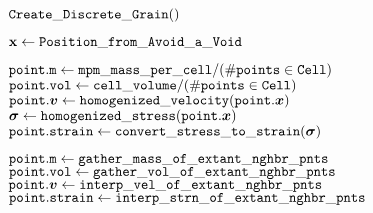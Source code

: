 \begin{algorithm}
\caption{${\tt Discrete \_ Avoid \_ a \_ Void}$}
\begin{algorithmic}[1]
      \State ${\tt Create \_ Discrete \_ Grain}()$
    \EndFor
  \EndFor
\end{algorithmic} \label{alg:discrete_avoid_a_void}
\end{algorithm}

\begin{algorithm}
\caption{${\tt Create \_ Continuum \_ Particle]}$}
\begin{algorithmic}[1]
\State $\mathbf{x} \gets {\tt Position \_ from \_ Avoid \_ a \_ Void}$
\end{algorithmic} \label{alg:create_continuum_particle}
\end{algorithm}

\begin{algorithm}
\caption{${\tt Reassign \_ Hybrid \_ Continuum \_ Properties}$}
\begin{algorithmic}[1]
    \State ${\tt point.m} \leftarrow {\tt mpm \_ mass \_ per \_ cell} / ({\tt \#points} \in {\tt Cell}) $
    \State ${\tt point.vol} \leftarrow {\tt cell \_ volume} / ({\tt \#points} \in {\tt Cell}) $
    \State ${\tt point.}\boldsymbol{v} \leftarrow {\tt homogenized \_ velocity} ({\tt point.}\boldsymbol{x}) $
    \State $\boldsymbol{\sigma} \leftarrow {\tt homogenized \_ stress} ({\tt point.}\boldsymbol{x})$ 
    \State ${\tt point.strain} \leftarrow {\tt convert \_ stress \_ to \_ strain} (\boldsymbol{\sigma}) $
  \EndFor
\end{algorithmic} \label{alg:determine_properties_for_hybrid_continuum_particles}
\end{algorithm}

\begin{algorithm}
\caption{${\tt Determine \_ New \_ Inner \_ Continuum \_ Properties}$}
\begin{algorithmic}[1]
    \State ${\tt point.m} \leftarrow {\tt gather \_ mass \_ of \_ extant \_ nghbr \_ pnts} $
    \State ${\tt point.vol} \leftarrow {\tt gather \_ vol \_ of \_ extant \_ nghbr \_ pnts} $
    \State ${\tt point.}\boldsymbol{v} \leftarrow {\tt interp \_ vel \_ of \_ extant \_ nghbr \_ pnts} $
    \State ${\tt point.strain} \leftarrow {\tt interp \_ strn \_ of \_ extant \_ nghbr \_ pnts} $
  \EndFor
\end{algorithmic} \label{alg:determine_properties_for_new_inner_continuum_particles}
\end{algorithm}

